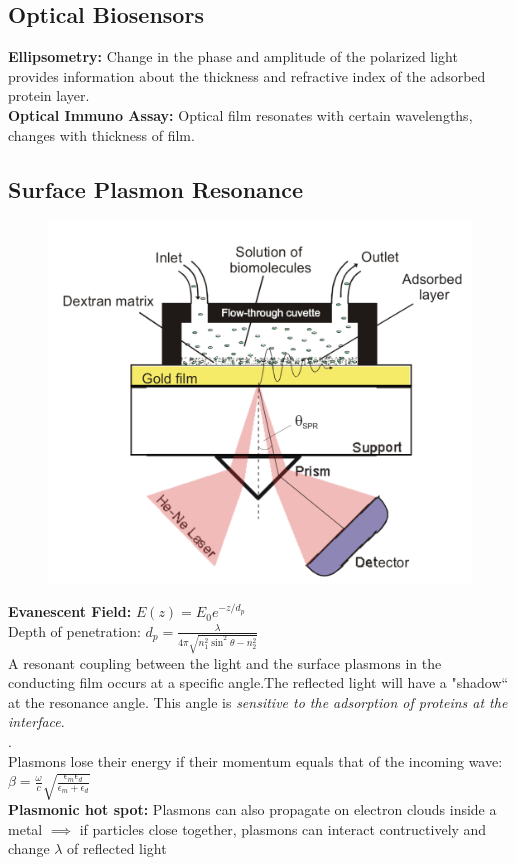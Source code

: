 \documentclass[9pt]{article}
\begin{document}
\begin{multicols}{2}
\section{Optical Biosensors}
 \textbf{Ellipsometry: }Change in the phase and amplitude of the polarized light provides information about the thickness and
refractive index of the adsorbed protein layer.\\
\textbf{Optical Immuno Assay: } Optical film resonates with certain wavelengths, changes with thickness of film.
\subsection{Surface Plasmon Resonance}
\begin{figure}
\includegraphics[scale=0.2]{Images/surface_plasmon_resonance.png}
\end{figure}
\textbf{Evanescent Field: } $E(z)=E_0 e^{-z/d_p}$\\
Depth of penetration: $d_p = \frac{\lambda}{4\pi \sqrt{n_1 ^2 \sin ^2 \theta -n_2 ^2}}$\\
A resonant coupling between the light and the surface plasmons in the conducting film occurs at a specific angle.The reflected light will have a "shadow“ at the resonance angle. This angle is \textit{sensitive to the adsorption of proteins at the interface}. \\
.\\
Plasmons lose their energy if their momentum equals that of the incoming wave: $\beta = \frac{\omega}{c}\sqrt{\frac{\epsilon _m \epsilon _d}{\epsilon _m + \epsilon _d}}$\\
\textbf{Plasmonic hot spot: } Plasmons can also propagate on electron clouds inside a metal $\implies$ if particles close together, plasmons can interact contructively and change $\lambda$ of reflected light

\end{multicols}
\end{document}

